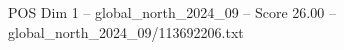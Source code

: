 \begin{textsample}{POS Dim 1 – global\_north\_2024\_09 – Score 26.00 – global\_north\_2024\_09/113692206.txt}
\end{textsample}
